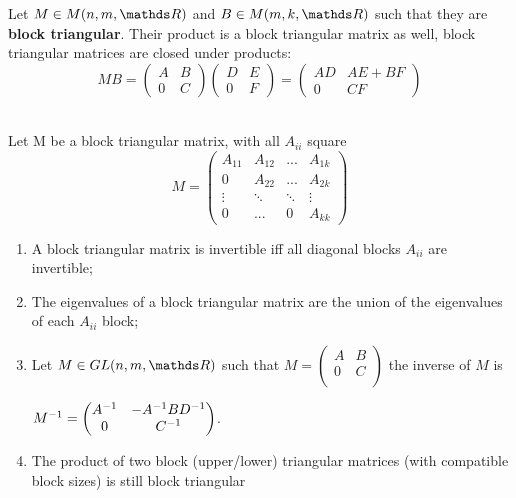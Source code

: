 \documentclass[computational_mathematics.tex]{subfiles}
\begin{document}
\begin{proposition}
  Let $M \in M(n, m, \R)$ and $B \in M(m, k, \R)$ such that they are \textbf{block triangular}.
  Their product is a block triangular matrix as well, block triangular matrices
are closed under products:
  $$M B 
  = \begin{pmatrix}
    A & B\\
    0 & C
  \end{pmatrix}
  \begin{pmatrix}
    D & E\\
    0 & F
  \end{pmatrix}
  = 
  \begin{pmatrix}
    AD & AE + BF\\
    0 & CF
  \end{pmatrix}$$
\end{proposition}

\begin{proposition}~\\
    Let M be a block triangular matrix, with all $A_{ii}$ square
    $$M 
      = \begin{pmatrix}
        A_{11}  & A_{12} & ... & A_{1k}\\
        0       & A_{22} & ... & A_{2k}\\
        \vdots  &\ddots & \ddots & \vdots\\
        0       & ... & 0 & A_{kk}
      \end{pmatrix}$$ 
    \begin{enumerate}
      \item A block triangular matrix is invertible iff all diagonal blocks $A_{ii}$ are invertible;
      \item The eigenvalues of a block triangular matrix are the union of the eigenvalues of each $A_{ii}$ block;
      \item Let $M \in GL(n, m, \R)$ such that $M= 
        \begin{pmatrix}
          A & B\\
          0 & C\\
        \end{pmatrix}$ 
       the inverse of $M$ is 
        
        ${M}^{-1} = 
        \begin{pmatrix}
          {A}^{-1} & -{A}^{-1}B{D}^{-1}\\
          0 & {C}^{-1}
        \end{pmatrix}$.
      \item The product of two block (upper/lower) triangular matrices
(with compatible block sizes) is still block triangular
    \end{enumerate}
  \end{proposition}
\end{document}
